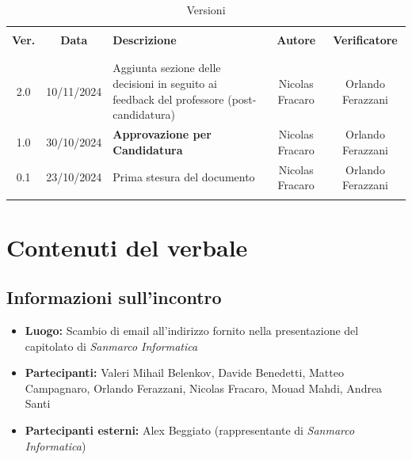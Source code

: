 \documentclass[italian, 12pt]{article}
\begin{document}
\pagestyle{mystyle}


\begin{table}[!h]
	\caption{Versioni}
	\begin{center}
		\begin{tabular}{ c c p{6.2cm} c c}
			\hline \\[-2ex]
			\textbf{Ver.} & \textbf{Data} & \textbf{Descrizione} & \textbf{Autore} & \textbf{Verificatore}  \\
			\\[-2ex] \hline \\[-1.5ex]
            2.0 & 10/11/2024 & Aggiunta sezione delle decisioni in seguito ai feedback del professore (post-candidatura) & Nicolas Fracaro & Orlando Ferazzani\\
            1.0 & 30/10/2024 & \textbf{Approvazione per Candidatura} & Nicolas Fracaro & Orlando Ferazzani\\
			0.1 & 23/10/2024 & Prima stesura del documento & Nicolas Fracaro & Orlando Ferazzani\\
			\\[-1.5ex] \hline
		\end{tabular}
	\end{center}
\end{table}


\tableofcontents
\newpage

\section{Contenuti del verbale}

\subsection{Informazioni sull'incontro}
\begin{itemize}
    \item \textbf{Luogo:} Scambio di email all'indirizzo fornito nella presentazione del capitolato di \textit{Sanmarco Informatica}
    \item \textbf{Partecipanti:} Valeri Mihail Belenkov, Davide Benedetti, Matteo Campagnaro, Orlando Ferazzani, Nicolas Fracaro, Mouad Mahdi, Andrea Santi
    \item \textbf{Partecipanti esterni:} Alex Beggiato (rappresentante di \textit{Sanmarco Informatica})
\end{itemize}
\end{document}
